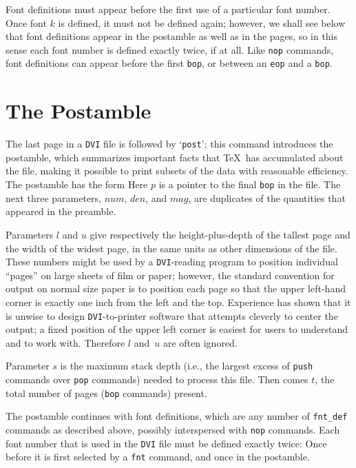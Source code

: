\documentclass[10pt, a4paper]{article}
\begin{document}
Font definitions must appear before the first use of a particular font number.
Once font $k$ is defined, it must not be defined again; 
however, we shall see below 
that font definitions appear in the postamble as well as in the pages, 
so in this sense each font number is defined exactly twice, if at all. 
Like \texttt{nop} commands, 
font definitions can appear before the first \texttt{bop}, 
or between an \texttt{eop} and a \texttt{bop}. 

\section{The Postamble}\label{sec:postamble}

The last page in a \texttt{DVI} file is followed by `\texttt{post}'; 
this command introduces the postamble, 
which summarizes important facts that \TeX\ has accumulated about the file, 
making it possible to print subsets of the data with reasonable efficiency. 
The postamble has the form
Here $p$ is a pointer to the final \texttt{bop} in the file. The next three
parameters, $num$, $den$, and $mag$, are duplicates of the quantities that
appeared in the preamble.

Parameters $l$ and $u$ give respectively the height-plus-depth of the tallest
page and the width of the widest page, in the same units as other dimensions
of the file. These numbers might be used by a \texttt{DVI}-reading program to
position individual ``pages'' on large sheets of film or paper; however,
the standard convention for output on normal size paper is to position each
page so that the upper left-hand corner is exactly one inch from the left
and the top. 
Experience has shown that it is unwise to design \texttt{DVI}-to-printer
software that attempts cleverly to center the output; a fixed position of
the upper left corner is easiest for users to understand and to work with.
Therefore $l$ and~$u$ are often ignored.

Parameter $s$ is the maximum stack depth 
(i.e., 
the largest excess of \texttt{push} commands over \texttt{pop} commands)
 needed to process this file. 
Then comes $t$, the total number of pages (\texttt{bop} commands) present.

The postamble continues with font definitions, 
which are any number of \texttt{fnt\_def} commands as described above, 
possibly interspersed with \texttt{nop} commands. 
Each font number that is used in the \texttt{DVI} file must be defined
exactly twice: Once before it is first selected by a \texttt{fnt} command, 
and once in the postamble.
\end{document}
